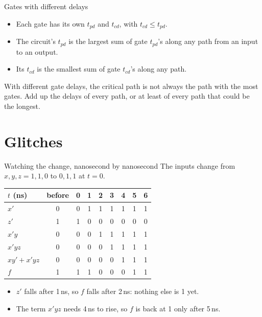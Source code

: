 \documentclass[10pt]{wosm-slides}
\begin{document}
\begin{frame}{Gates with different delays}
  \begin{itemize}
    \item Each gate has its own $t_{pd}$ and $t_{cd}$, with $t_{cd} \le t_{pd}$.
    \item The circuit's $t_{pd}$ is the largest sum of gate $t_{pd}$'s along any path
      from an input to an output.
    \item Its $t_{cd}$ is the smallest sum of gate $t_{cd}$'s along any path.
  \end{itemize}

  \bigskip
  \begin{warning}
    With different gate delays, the critical path is not always the path with the
    most gates. Add up the delays of every path, or at least of every path that could
    be the longest.
  \end{warning}
\end{frame}

\section{Glitches}

\begin{frame}{Watching the change, nanosecond by nanosecond}
  The inputs change from $x, y, z = 1, 1, 0$ to $0, 1, 1$ at $t = 0$.

  \medskip
  \begin{center}
    \begin{tabular}{@{}l|c|ccccccc@{}}
      $t$ (ns) & before & 0 & 1 & 2 & 3 & 4 & 5 & 6 \\
      \midrule
      $x'$ & 0 & 0 & 1 & 1 & 1 & 1 & 1 & 1 \\
      $z'$ & 1 & 1 & 0 & 0 & 0 & 0 & 0 & 0 \\
      $x'y$ & 0 & 0 & 0 & 1 & 1 & 1 & 1 & 1 \\
      $x'yz$ & 0 & 0 & 0 & 0 & 1 & 1 & 1 & 1 \\
      $xy' + x'yz$ & 0 & 0 & 0 & 0 & 0 & 1 & 1 & 1 \\
      $f$ & 1 & 1 & 1 & \alert{0} & \alert{0} & \alert{0} & 1 & 1 \\
    \end{tabular}
  \end{center}

  \medskip
  \begin{itemize}
    \item $z'$ falls after 1\,ns, so $f$ falls after 2\,ns: nothing else is 1 yet.
    \item The term $x'yz$ needs 4\,ns to rise, so $f$ is back at 1 only after 5\,ns.
  \end{itemize}
\end{frame}
\end{document}
